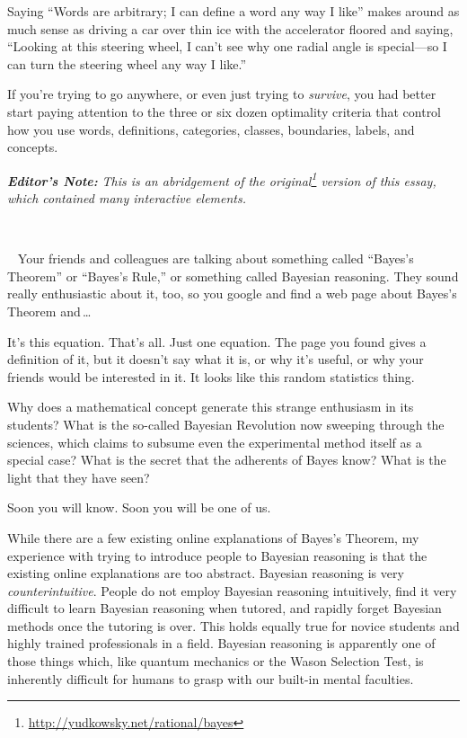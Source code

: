 {{{
 Saying ``Words are arbitrary; I can define a word
any way I like'' makes around as much sense as
driving a car over thin ice with the accelerator floored and saying,
``Looking at this steering wheel, I
can't see why one radial angle is special---so I can
turn the steering wheel any way I like.''}

{
 If you're trying to go anywhere, or even just
trying to \textit{survive}, you had better start paying attention to
the three or six dozen optimality criteria that control how you use
words, definitions, categories, classes, boundaries, labels, and
concepts.}

\myendsectiontext

\label{intuitive_bayesian}

{
\textbf{\textit{Editor's
Note:}}\textit{ This is an abridgement of the
 original\footnote{\url{http://yudkowsky.net/rational/bayes}} version of this essay, which contained many
interactive elements.}}

{
\textit{ ~}}

{
\textit{\ } Your friends and colleagues are talking about something
called ``Bayes's
Theorem'' or
``Bayes's Rule,'' or
something called Bayesian reasoning. They sound really enthusiastic
about it, too, so you google and find a web page about
Bayes's Theorem and\,\ldots}

{
 It's this equation. That's all.
Just one equation. The page you found gives a definition of it, but it
doesn't say what it is, or why it's
useful, or why your friends would be interested in it. It looks like
this random statistics thing.}

{
 Why does a mathematical concept generate this strange enthusiasm
in its students? What is the so-called Bayesian Revolution now sweeping
through the sciences, which claims to subsume even the experimental
method itself as a special case? What is the secret that the adherents
of Bayes know? What is the light that they have seen?}

{
 Soon you will know. Soon you will be one of us.}

{
 While there are a few existing online explanations of
Bayes's Theorem, my experience with trying to introduce
people to Bayesian reasoning is that the existing online explanations
are too abstract. Bayesian reasoning is very \textit{counterintuitive}.
People do not employ Bayesian reasoning intuitively, find it very
difficult to learn Bayesian reasoning when tutored, and rapidly forget
Bayesian methods once the tutoring is over. This holds equally true for
novice students and highly trained professionals in a field. Bayesian
reasoning is apparently one of those things which, like quantum
mechanics or the Wason Selection Test, is inherently difficult for
humans to grasp with our built-in mental faculties.}

}}
